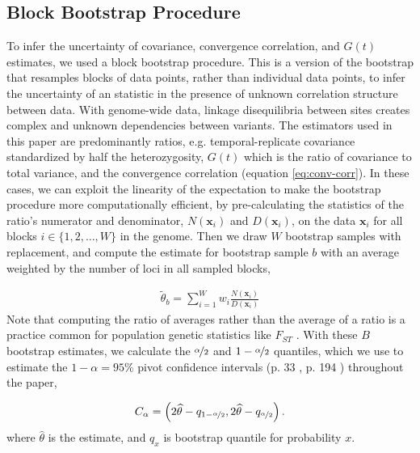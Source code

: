 \documentclass[11pt]{article}
\begin{document}
\subsection{Block Bootstrap Procedure}
\label{supp:block-bootstrap}


To infer the uncertainty of covariance, convergence correlation, and $G(t)$
estimates, we used a block bootstrap procedure. This is a version of the
bootstrap that resamples blocks of data points, rather than individual data
points, to infer the uncertainty of an statistic in the presence of unknown
correlation structure between data. With genome-wide data, linkage
disequilibria between sites creates complex and unknown dependencies between
variants. The estimators used in this paper are predominantly ratios, e.g.
temporal-replicate covariance standardized by half the heterozygosity,
$G(t)$ which is the ratio of covariance to total variance, and the
convergence correlation (equation \eqref{eq:conv-corr}). In these cases, we can
exploit the linearity of the expectation to make the bootstrap procedure more
computationally efficient, by pre-calculating the statistics of the ratio's
numerator and denominator, $N(\mathbf{x}_i)$ and $D(\mathbf{x}_i)$, on the data
$\mathbf{x}_i$ for all blocks $i \in \{1, 2, \ldots, W\}$ in the genome. Then
we draw $W$ bootstrap samples with replacement, and compute the estimate for
bootstrap sample $b$ with an average weighted by the number of loci in all
sampled blocks, 

\begin{align}
  \tilde{\theta}_b = \sum_{i=1}^W w_i \frac{N(\mathbf{x}_i)}{D(\mathbf{x}_i)}
\end{align}
%
Note that computing the ratio of averages rather than the average of a ratio is
a practice common for population genetic statistics like $F_{ST}$
\parencite{Bhatia2013-zy}. With these $B$ bootstrap estimates, we calculate the
$\nicefrac{\alpha}{2}$ and $1-\nicefrac{\alpha}{2}$ quantiles, which we use to
estimate the $1-\alpha = 95\%$ pivot confidence intervals (p. 33
\cite{Wasserman2006-jl}, p. 194 \cite{Davison2013-oy}) throughout the paper,

\begin{align}
  C_\alpha = \left(2 \widehat{\theta} - q_{1-\nicefrac{\alpha}{2}}, 2 \widehat{\theta} - q_{\nicefrac{\alpha}{2}} \right).
\end{align}
%
where $\widehat{\theta}$ is the estimate, and $q_x$ is bootstrap quantile for
probability $x$.
\end{document}
